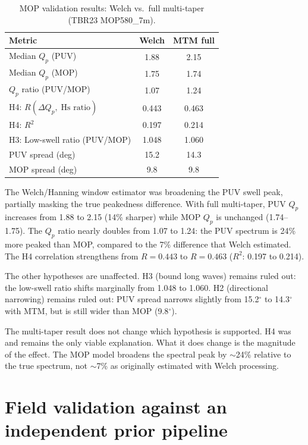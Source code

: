 \documentclass[11pt]{article}
\begin{document}
\begin{table}[htbp]
  \centering
  \caption{MOP validation results: Welch vs.\ full multi-taper
    (TBR23 MOP580\_7m).}
  \label{tab:hyp}
  \begin{tabular}{@{}lcc@{}}
    \toprule
    Metric & Welch & MTM full \\
    \midrule
    Median $Q_p$ (PUV)            & 1.88  & 2.15  \\
    Median $Q_p$ (MOP)            & 1.75  & 1.74  \\
    $Q_p$ ratio (PUV/MOP)         & 1.07  & 1.24  \\
    H4: $R(\Delta Q_p,\;\text{Hs ratio})$ & 0.443 & 0.463 \\
    H4: $R^2$                     & 0.197 & 0.214 \\
    \midrule
    H3: Low-swell ratio (PUV/MOP) & 1.048 & 1.060 \\
    PUV spread (deg)              & 15.2  & 14.3  \\
    MOP spread (deg)              & 9.8   & 9.8   \\
    \bottomrule
  \end{tabular}
\end{table}

The Welch/Hanning window estimator was broadening the PUV swell peak, partially
masking the true peakedness difference. With full multi-taper, PUV
$Q_p$ increases from 1.88 to 2.15 (14\% sharper) while MOP $Q_p$
is unchanged (1.74--1.75). The $Q_p$ ratio nearly doubles from 1.07
to 1.24: the PUV spectrum is 24\% more peaked than MOP, compared to
the 7\% difference that Welch estimated. The H4 correlation
strengthens from $R = 0.443$ to $R = 0.463$ ($R^2$: 0.197 to
0.214).

The other hypotheses are unaffected. H3 (bound long waves) remains
ruled out: the low-swell ratio shifts marginally from 1.048 to
1.060. H2 (directional narrowing) remains ruled out: PUV spread
narrows slightly from 15.2$^\circ$ to 14.3$^\circ$ with MTM, but
is still wider than MOP (9.8$^\circ$).

The multi-taper result does not change which hypothesis is supported.
H4 was and remains the only viable explanation. What it does
change is the magnitude of the effect. The MOP model broadens the
spectral peak by $\sim$24\% relative to the true spectrum, not
$\sim$7\% as originally estimated with Welch processing.

\section{Field validation against an independent prior pipeline}
\label{sec:ruby2d}
\end{document}
